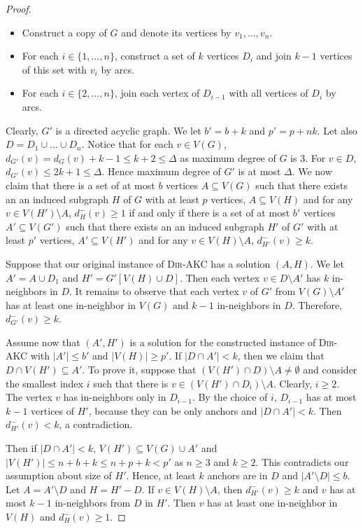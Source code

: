 \documentclass[11pt,a4paper]{article}
\newcommand{\DAKC}{\textsc{Dir-AKC}\xspace}
\begin{document}
\begin{proof}
\begin{itemize}
\item Construct a copy of $G$ and denote its vertices by $v_1,\ldots,v_n$.
\item For each $i\in\{1,\ldots,n\}$, construct a set of $k$ vertices $D_i$ and join $k-1$ vertices of this set with $v_i$
    by arcs.
\item For each $i\in \{2,\ldots,n\}$, join each vertex of $D_{i-1}$ with all vertices of $D_i$ by arcs.
\end{itemize}
Clearly, $G'$ is a directed acyclic graph. We let $b'=b+k$ and $p'=p+nk$. Let also $D=D_1\cup\ldots\cup D_n$. Notice that for
each $v\in V(G)$, $d_{G'}(v)=d_G(v)+k-1\leq k+2\leq\Delta$ as maximum degree of $G$ is 3. For $v\in D$, $d_{G'}(v)\leq
2k+1\leq\Delta$. Hence maximum degree of $G'$ is at most $\Delta$. We now claim that there is a set of at most $b$ vertices
$A\subseteq V(G)$ such that there exists an an induced subgraph $H$ of $G$ with at least $p$ vertices, $A\subseteq V(H)$ and
for any $v\in V(H')\setminus A$,  $d_{H}^-(v)\geq 1$ if and only if there is a set of at most $b'$ vertices $A'\subseteq
V(G')$ such that there exists an an induced subgraph $H'$ of $G'$ with at least $p'$ vertices, $A'\subseteq V(H')$ and for any
$v\in V(H)\setminus A$,  $d_{H'}^-(v)\geq k$.

Suppose that our original instance of \DAKC has a solution $(A,H)$. We let $A'=A\cup D_1$ and $H'=G'[V(H)\cup D]$. Then each
vertex $v\in D\setminus A'$ has $k$ in-neighbors in $D$. It remains to observe that each vertex $v$ of $G'$ from
$V(G)\setminus A'$ has at least one in-neighbor in $V(G)$ and $k-1$ in-neighbors in $D$. Therefore, $d_{G'}^-(v)\geq k$.

Assume now that $(A',H')$ is a solution for the constructed instance of \DAKC with $|A'|\leq b'$ and $|V(H)|\geq p'$. If
$|D\cap A'|<k$, then we claim that $D\cap V(H')\subseteq A'$. To prove it, suppose that $(V(H')\cap D)\setminus
A\neq\emptyset$ and consider the smallest index $i$ such that there is $v\in (V(H')\cap D_i)\setminus A$. Clearly, $i\geq 2$.
The vertex $v$ has in-neighbors only in $D_{i-1}$. By the choice of $i$, $D_{i-1}$ has at most $k-1$ vertices of $H'$, because
they can be only anchors and $|D\cap A'|<k$. Then $d_{H'}^-(v)<k$, a contradiction.

Then if $|D\cap A'|<k$, $V(H')\subseteq V(G)\cup A'$ and $|V(H')|\leq n+b+k\leq n+p+k<p'$ as $n\geq 3$ and $k\geq 2$. This
contradicts our assumption about size of $H'$. Hence, at least $k$ anchors are in $D$ and $|A'\setminus D|\leq b$. Let
$A=A'\setminus D$ and $H=H'-D$. If $v\in V(H)\setminus A$, then $d_{H'}^-(v)\geq k$ and $v$ has at most $k-1$ in-neighbors
from $D$ in $H'$. Then $v$ has at least one in-neighbor in $V(H)$ and $d_H^-(v)\geq 1$.
\end{proof}
\end{document}
